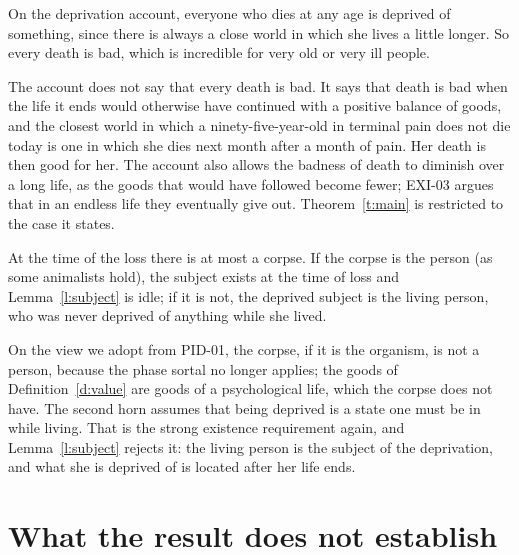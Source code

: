 \documentclass{situationist-preprint}
\begin{document}
\begin{objection}\label{o:much}
On the deprivation account, everyone who dies at any age is deprived of something, since there is always a close world in which she lives a little longer. So every death is bad, which is incredible for very old or very ill people.
\end{objection}

\begin{reply}
The account does not say that every death is bad. It says that death is bad when the life it ends would otherwise have continued with a positive balance of goods, and the closest world in which a ninety-five-year-old in terminal pain does not die today is one in which she dies next month after a month of pain. Her death is then good for her. The account also allows the badness of death to diminish over a long life, as the goods that would have followed become fewer; EXI-03 argues that in an endless life they eventually give out. Theorem~\ref{t:main} is restricted to the case it states.
\end{reply}

\begin{objection}\label{o:who}
At the time of the loss there is at most a corpse. If the corpse is the person (as some animalists hold), the subject exists at the time of loss and Lemma~\ref{l:subject} is idle; if it is not, the deprived subject is the living person, who was never deprived of anything while she lived.
\end{objection}

\begin{reply}
On the view we adopt from PID-01, the corpse, if it is the organism, is not a person, because the phase sortal no longer applies; the goods of Definition~\ref{d:value} are goods of a psychological life, which the corpse does not have. The second horn assumes that being deprived is a state one must be in while living. That is the strong existence requirement again, and Lemma~\ref{l:subject} rejects it: the living person is the subject of the deprivation, and what she is deprived of is located after her life ends.
\end{reply}

\section{What the result does not establish}
\end{document}
